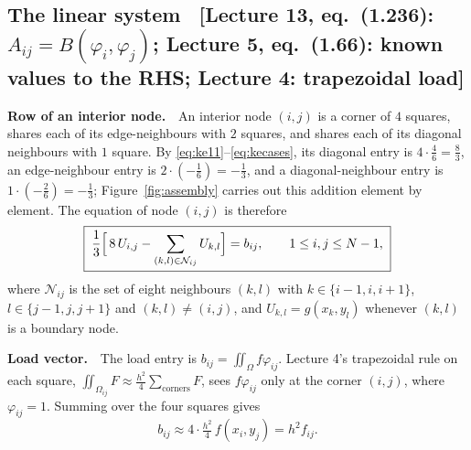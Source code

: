 \documentclass[11pt]{article}
\newcommand{\Om}{\Omega}
\newcommand{\Iint}{\iint_{\Om}}
\newcommand{\src}[1]{{\small\color{black!55}\textsf{[#1]}}}
\begin{document}
\subsection*{The linear system
  \ \src{Lecture 13, eq.~(1.236): $A_{ij}=B(\varphi_{i},\varphi_{j})$;
         Lecture 5, eq.~(1.66): known values to the RHS; Lecture 4: trapezoidal load}}

\textbf{Row of an interior node.}\ \ An interior node $(i,j)$ is a corner of
$4$ squares, shares each of its edge-neighbours with $2$ squares, and shares
each of its diagonal neighbours with $1$ square.  By \eqref{eq:ke11}--\eqref{eq:kecases}, its
diagonal entry is $4\cdot\tfrac46=\tfrac83$, an edge-neighbour entry is
$2\cdot(-\tfrac16)=-\tfrac13$, and a diagonal-neighbour entry is
$1\cdot(-\tfrac26)=-\tfrac13$; Figure~\ref{fig:assembly} carries out this
addition element by element.  The equation of node $(i,j)$ is therefore
\begin{equation}\label{eq:row}
  \boxed{\;\frac13\Bigl[\,8\,U_{i,j}-\sum_{(k,l)\in\mathcal{N}_{ij}}U_{k,l}\Bigr]=b_{ij},
  \qquad 1\le i,j\le N-1,\;}
\end{equation}
where $\mathcal{N}_{ij}$ is the set of eight neighbours $(k,l)$ with
$k\in\{i-1,i,i+1\}$, $l\in\{j-1,j,j+1\}$ and $(k,l)\neq(i,j)$, and
$U_{k,l}=g(x_{k},y_{l})$ whenever $(k,l)$ is a boundary node.

\textbf{Load vector.}\ \ The load entry is $b_{ij}=\Iint f\varphi_{ij}$.
Lecture 4's trapezoidal rule on each square,
$\iint_{\Om_{ij}}F\approx\tfrac{h^{2}}{4}\sum_{\text{corners}}F$, sees
$f\varphi_{ij}$ only at the corner $(i,j)$, where $\varphi_{ij}=1$.  Summing
over the four squares gives
\begin{equation}\label{eq:load}
  b_{ij}\approx4\cdot\tfrac{h^{2}}{4}\,f(x_{i},y_{j})=h^{2}f_{ij} .
\end{equation}
\end{document}
